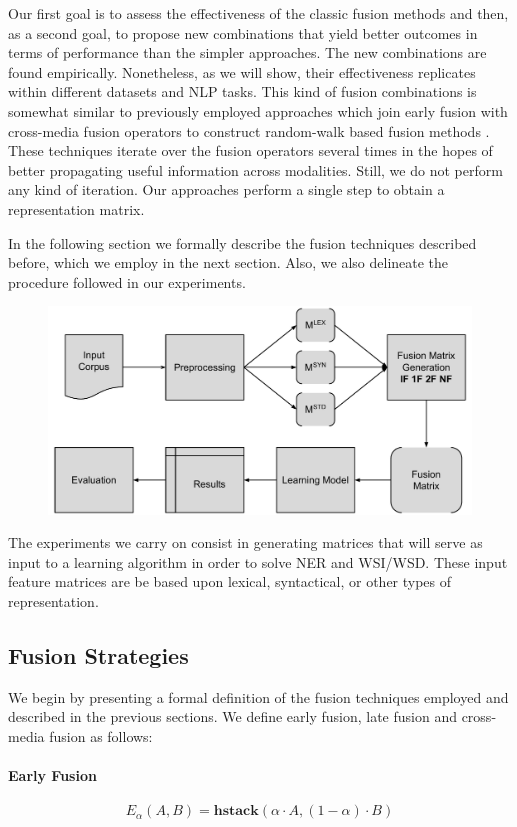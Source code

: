 \documentclass[11pt]{article}
\begin{document}
Our first goal is to assess the effectiveness of the classic fusion methods and then, as a second goal, to propose new combinations that yield better outcomes in terms of performance than the simpler approaches. The new combinations are found empirically. Nonetheless, as we will show, their effectiveness replicates within different datasets and NLP tasks. This kind of fusion combinations is somewhat similar to previously employed approaches which join early fusion with cross-media fusion operators to construct random-walk based fusion methods \cite{Ah-PineCC15,GialampoukidisM16}. These techniques iterate over the fusion operators several times in the hopes of better propagating useful information across modalities. Still, we do not perform any kind of iteration. Our approaches perform a single step to obtain a representation matrix.

In the following section we formally describe the fusion techniques described before, which we employ in the next section. Also, we also delineate the procedure followed in our experiments. 

\begin{figure}
\centering
\includegraphics[width=0.85\linewidth]{img/diag_metodo}
\caption{}
\label{fig:diagmetodo}
\end{figure}

The experiments we carry on consist in generating matrices that will serve as input to a learning algorithm in order to solve NER and WSI/WSD. These input feature matrices are be based upon lexical, syntactical, or other types of representation. 

\subsection{Fusion Strategies}
We begin by presenting a  formal definition of the fusion techniques employed and described in the previous sections. We define early fusion, late fusion and cross-media fusion as follows:
\paragraph{Early Fusion}
\begin{equation}
E_\alpha(A,B) = \mathbf{hstack}(\alpha\cdot A , (1-\alpha)\cdot B)
\end{equation}
\end{document}
